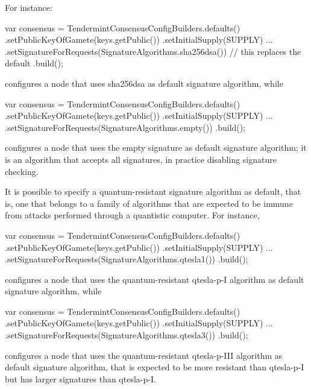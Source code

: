 For instance:
%
\begin{codebox}\begin{javalst}
var consensus = TendermintConsensusConfigBuilders.defaults()
  .setPublicKeyOfGamete(keys.getPublic())
  .setInitialSupply(SUPPLY)
  ...
  .setSignatureForRequests(SignatureAlgorithms.sha256dsa()) // this replaces the default
  .build();
\end{javalst}\end{codebox}
%
configures a node that uses sha256dsa as default signature algorithm, while
%
\begin{codebox}\begin{javalst}
var consensus = TendermintConsensusConfigBuilders.defaults()
  .setPublicKeyOfGamete(keys.getPublic())
  .setInitialSupply(SUPPLY)
  ...
  .setSignatureForRequests(SignatureAlgorithms.empty())
  .build();
\end{javalst}\end{codebox}
%
configures a node that uses the empty signature as default signature algorithm; it is an
algorithm that accepts all signatures, in practice disabling signature checking.

It is possible to specify a quantum-resistant signature algorithm as default,
that is, one that belongs to
a family of algorithms that are expected to be immune from attacks performed through
a quantistic computer. For instance,
%
\begin{codebox}\begin{javalst}
var consensus = TendermintConsensusConfigBuilders.defaults()
  .setPublicKeyOfGamete(keys.getPublic())
  .setInitialSupply(SUPPLY)
  ...
  .setSignatureForRequests(SignatureAlgorithms.qtesla1())
  .build();
\end{javalst}\end{codebox}
%
configures a node that uses the quantum-resistant qtesla-p-I algorithm as default signature algorithm,
while
%
\begin{codebox}\begin{javalst}
var consensus = TendermintConsensusConfigBuilders.defaults()
  .setPublicKeyOfGamete(keys.getPublic())
  .setInitialSupply(SUPPLY)
  ...
  .setSignatureForRequests(SignatureAlgorithms.qtesla3())
  .build();
\end{javalst}\end{codebox}
%
configures a node that uses the quantum-resistant qtesla-p-III
algorithm as default signature algorithm, that is expected to be more resistant than
qtesla-p-I but has larger signatures than qtesla-p-I.

